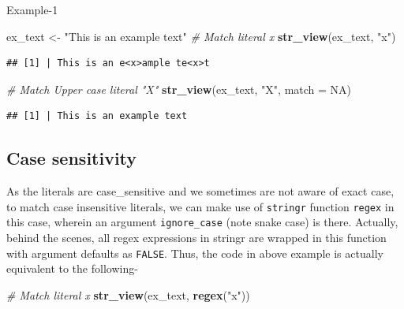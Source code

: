 \documentclass[
]{book}
\newenvironment{Shaded}{\begin{snugshade}}{\end{snugshade}}
\newcommand{\AttributeTok}[1]{\textcolor[rgb]{0.13,0.29,0.53}{#1}}
\newcommand{\CommentTok}[1]{\textcolor[rgb]{0.56,0.35,0.01}{\textit{#1}}}
\newcommand{\ConstantTok}[1]{\textcolor[rgb]{0.56,0.35,0.01}{#1}}
\newcommand{\FunctionTok}[1]{\textcolor[rgb]{0.13,0.29,0.53}{\textbf{#1}}}
\newcommand{\NormalTok}[1]{#1}
\newcommand{\OtherTok}[1]{\textcolor[rgb]{0.56,0.35,0.01}{#1}}
\newcommand{\StringTok}[1]{\textcolor[rgb]{0.31,0.60,0.02}{#1}}
\begin{document}
Example-1

\begin{Shaded}
\begin{Highlighting}[]
\NormalTok{ex\_text }\OtherTok{\textless{}{-}} \StringTok{"This is an example text"}
\CommentTok{\# Match literal \textasciigrave{}x\textasciigrave{}}
\FunctionTok{str\_view}\NormalTok{(ex\_text, }\StringTok{"x"}\NormalTok{)}
\end{Highlighting}
\end{Shaded}

\begin{verbatim}
## [1] | This is an e<x>ample te<x>t
\end{verbatim}

\begin{Shaded}
\begin{Highlighting}[]
\CommentTok{\# Match Upper case literal "X"}
\FunctionTok{str\_view}\NormalTok{(ex\_text, }\StringTok{"X"}\NormalTok{, }\AttributeTok{match =} \ConstantTok{NA}\NormalTok{)}
\end{Highlighting}
\end{Shaded}

\begin{verbatim}
## [1] | This is an example text
\end{verbatim}

\hypertarget{case-sensitivity}{%
\subsection{Case sensitivity}\label{case-sensitivity}}

As the literals are case\_sensitive and we sometimes are not aware of exact case, to match case insensitive literals, we can make use of \texttt{stringr} function \texttt{regex} in this case, wherein an argument \texttt{ignore\_case} (note snake case) is there. Actually, behind the scenes, all regex expressions in stringr are wrapped in this function with argument defaults as \texttt{FALSE}. Thus, the code in above example is actually equivalent to the following-

\begin{Shaded}
\begin{Highlighting}[]
\CommentTok{\# Match literal \textasciigrave{}x\textasciigrave{}}
\FunctionTok{str\_view}\NormalTok{(ex\_text, }\FunctionTok{regex}\NormalTok{(}\StringTok{"x"}\NormalTok{))}
\end{Highlighting}
\end{Shaded}
\end{document}
